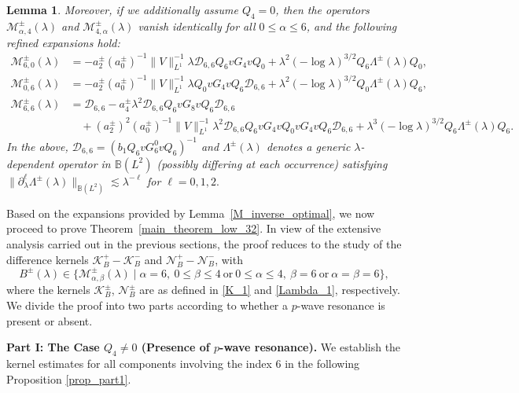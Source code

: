 \documentclass[reqno]{amsart}
\newtheorem{lemma}[theorem]{Lemma}
\numberwithin{equation}{section}
\begin{document}
\begin{lemma}
	Moreover, if we additionally assume $Q_4 = 0$, then the operators $\mathcal{M}_{\alpha,4}^{\pm}(\lambda)$ and $\mathcal{M}_{4,\alpha}^{\pm}(\lambda)$ vanish identically for all $0\leq \alpha\leq 6$, and the following refined expansions hold:
	\[  
	\begin{aligned}  
		\mathcal{M}_{6,0}^{\pm}(\lambda) &= -a_2^\pm (a_0^\pm)^{-1} \|V\|_{L^1}^{-1} \lambda \mathcal{D}_{6,6} Q_6 vG_4 vQ_0   
		+ \lambda^2 (-\log \lambda)^{3/2}Q_6 \Lambda^\pm(\lambda)Q_0, \\  
		\mathcal{M}_{0,6}^{\pm}(\lambda) &= -a_2^\pm (a_0^\pm)^{-1} \|V\|_{L^1}^{-1} \lambda Q_0 vG_4 vQ_6 \mathcal{D}_{6,6}  
		+ \lambda^2 (-\log \lambda)^{3/2} Q_0\Lambda^\pm(\lambda)Q_6,  \\  
		\mathcal{M}_{6,6}^{\pm}(\lambda) &= \mathcal{D}_{6,6} -a_4^\pm \lambda^2 \mathcal{D}_{6,6} Q_6 vG_8 vQ_6 \mathcal{D}_{6,6} \\  
		&\quad +(a_2^\pm)^2 (a_0^\pm)^{-1} \|V\|_{L^1}^{-1} \lambda^2 \mathcal{D}_{6,6} Q_6 vG_4 v  Q_0 vG_4 vQ_6 \mathcal{D}_{6,6} +\lambda^3 (-\log \lambda)^{3/2} Q_6\Lambda^\pm(\lambda)Q_6.  
	\end{aligned}  
	\]  
In the above, $\mathcal{D}_{6,6} = (b_1 Q_6 v G_6^0 v Q_6)^{-1}$ and  $\Lambda^\pm(\lambda)$ denotes a generic $\lambda$-dependent operator in $\mathbb{B}(L^2)$ (possibly differing at each occurrence) satisfying
$\|\partial_\lambda^{\ell} \Lambda^\pm(\lambda)\|_{\mathbb{B}(L^2)} \lesssim \lambda^{-\ell}$ for $ \ell=0,1,2.
$
\end{lemma}


Based on the expansions provided by Lemma~\ref{M_inverse_optimal}, we now proceed to prove Theorem~\ref{main_theorem_low_32}. In view of the extensive analysis carried out in the previous sections, the proof reduces to the study of the difference kernels
$
\mathcal{K}_{B}^+ - \mathcal{K}_{B}^-$ and $\mathcal{N}_{B}^+ - \mathcal{N}_{B}^-$,
with
\[
B^\pm(\lambda) \in \bigl\{ \mathcal{M}_{\alpha, \beta}^{\pm}(\lambda) \mid \alpha=6,\ 0 \le \beta \le 4 \ \text{or} \ 0 \le \alpha \le 4,\ \beta=6 \ \text{or} \ \alpha=\beta=6 \bigr\},
\]
where the kernels $\mathcal{K}_{B}^\pm$, $\mathcal{N}_{B}^\pm$ are as defined in \eqref{K_1} and \eqref{Lambda_1}, respectively. 
 We divide the proof into two parts according to
whether a $p$-wave resonance is present or absent.

\vspace{0.3cm}    
\textbf{Part I: The Case $Q_4 \neq 0$ (Presence of $p$-wave resonance).}    
 We establish the  kernel estimates for all components involving the index 6 in the following Proposition \ref{prop_part1}.  
\end{document}
